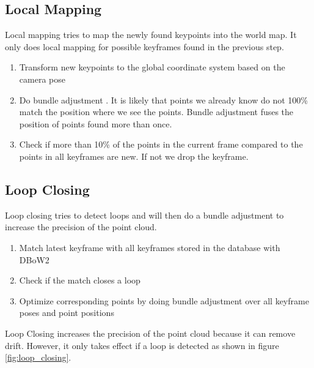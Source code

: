 \documentclass[11pt,a4paper,titlepage,oneside]{report}
\begin{document}
\subsection{Local Mapping}
Local mapping tries to map the newly found keypoints into the world map. It only does local mapping for possible keyframes found in the previous step.
\begin{enumerate}
	\item Transform new keypoints to the global coordinate system based on the camera pose
	\item Do bundle adjustment \cite{bundleadjustment}. It is likely that points we already know do not 100\% match the position where we see the points. Bundle adjustment fuses the position of points found more than once.
	\item Check if more than 10\% of the points in the current frame compared to the points in all keyframes are new. If not we drop the keyframe.
\end{enumerate}

\subsection{Loop Closing}
Loop closing tries to detect loops and will then do a bundle adjustment to increase the precision of the point cloud.
\begin{enumerate}
	\item Match latest keyframe with all keyframes stored in the database with DBoW2 \cite{dbow}
	\item Check if the match closes a loop
	\item Optimize corresponding points by doing bundle adjustment over all keyframe poses and point positions
\end{enumerate}

Loop Closing increases the precision of the point cloud because it can remove drift. However, it only takes effect if a loop is detected as shown in figure \ref{fig:loop_closing}.
\end{document}
